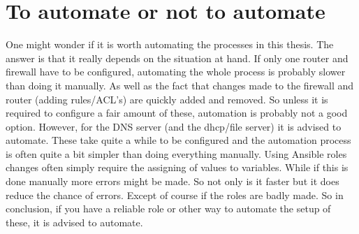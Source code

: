 \section{To automate or not to automate}
One might wonder if it is worth automating the processes in this thesis. The answer is that it really depends on the situation at hand. If only one router and firewall have to be configured, automating the whole process is probably slower than doing it manually. As well as the fact that changes made to the firewall and router (adding rules/ACL's) are quickly added and removed. So unless it is required to configure a fair amount of these, automation is probably not a good option. However, for the DNS server (and the dhcp/file server) it is advised to automate. These take quite a while to be configured and the automation process is often quite a bit simpler than doing everything manually. Using Ansible roles changes often simply require the assigning of values to variables. While if this is done manually more errors might be made. So not only is it faster but it does reduce the chance of errors. Except of course if the roles are badly made. So in conclusion, if you have a reliable role or other way to automate the setup of these, it is advised to automate.
















